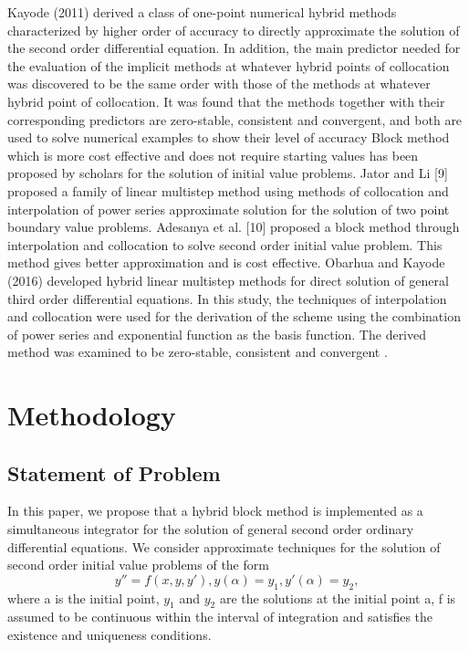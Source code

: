 \documentclass[12pt]{article}
\begin{document}
\noindent Kayode (2011) derived a class of one-point numerical hybrid methods characterized by higher order of accuracy to directly approximate the solution of the second order differential equation. In addition, the main predictor needed for the evaluation of the implicit methods at whatever hybrid points of collocation was discovered to be the same order with those of the methods at whatever hybrid point of collocation. It was found that the methods together with their corresponding predictors are zero-stable, consistent and convergent, and both are used to solve numerical examples to show their level of accuracy %
\noindent Block method which is more cost effective and does not require starting values has been proposed by scholars for the solution of initial value problems. Jator and Li [9] proposed a family of linear multistep method using methods of collocation and interpolation of power series approximate solution for the solution of two point boundary value problems. Adesanya et al. [10] proposed a block method through interpolation and collocation to solve second order initial value problem. This method gives better approximation and is cost effective.
\noindent Obarhua and Kayode (2016) developed hybrid linear multistep methods for direct solution of general third order differential equations. In this study, the techniques of interpolation and collocation were used for the derivation of the scheme using the combination of power series and exponential function as the basis function. The derived method was examined to be zero-stable, consistent and convergent \cite{obarhua}.

\bigskip
\bigskip
\bigskip
\bigskip
\bigskip


\section{Methodology}
\subsection{Statement of Problem}
In this paper, we propose that a hybrid block method is implemented as a simultaneous integrator for the solution of general second order ordinary differential equations. We consider approximate techniques for the solution of second order initial value problems of the form
	\begin{equation}
		y'' = f (x, y, y'), y(\alpha) = y_1 , y'(\alpha) = y_2 ,						 		
	\end{equation}
	where a is the initial point, $y_1$ and $y_2$ are the solutions at the initial point a, f is assumed to be continuous within the interval of integration and satisfies the existence and uniqueness conditions.
\end{document}
